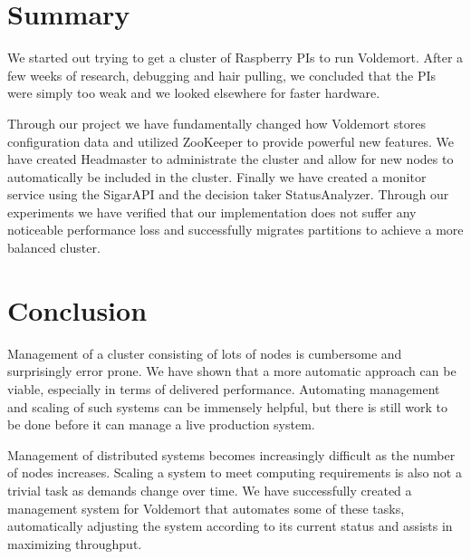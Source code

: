 \section{Summary}
We started out trying to get a cluster of Raspberry PIs to run Voldemort. After a few weeks of research, debugging and hair pulling, we concluded that the PIs were simply too weak and we looked elsewhere for faster hardware. 

Through our project we have fundamentally changed how Voldemort stores configuration data and utilized ZooKeeper to provide powerful new features. We have created Headmaster to administrate the cluster and allow for new nodes to automatically be included in the cluster. Finally we have created a monitor service using the SigarAPI and the decision taker StatusAnalyzer. Through our experiments we have verified that our implementation does not suffer any noticeable performance loss and successfully migrates partitions to achieve a more balanced cluster. 

\section{Conclusion}

Management of a cluster consisting of lots of nodes is cumbersome and surprisingly error prone. We have shown that a more automatic approach can be viable, especially in terms of delivered performance. Automating management and scaling of such systems can be immensely helpful, but there is still work to be done before it can manage a live production system.

Management of distributed systems becomes increasingly difficult as the number of nodes increases. Scaling a system to meet computing requirements is also not a trivial task as demands change over time. We have successfully created a management system for Voldemort that automates some of these tasks, automatically adjusting the system according to its current status and assists in maximizing throughput. 


